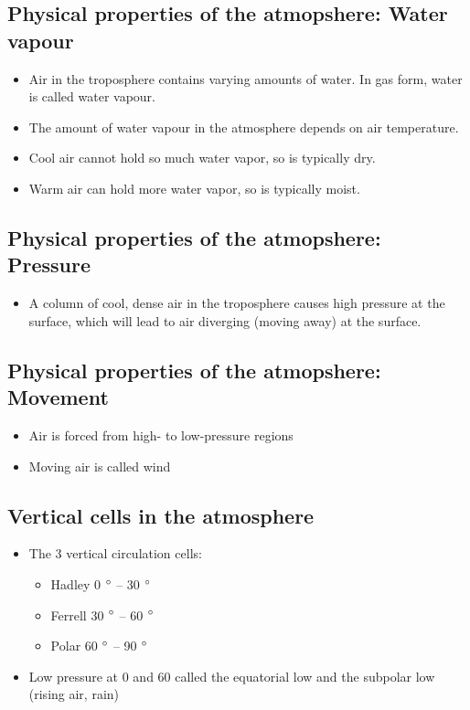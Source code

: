 \subsection{Physical properties of the atmopshere: Water vapour}

\begin{itemize}
    \item Air in the troposphere contains varying amounts of water. In gas
        form, water is called water vapour.
    \item The amount of water vapour in the atmosphere depends on air
        temperature.
    \item Cool air cannot hold so much water vapor, so is typically dry.
    \item Warm air can hold more water vapor, so is typically moist.
\end{itemize}

\subsection{Physical properties of the atmopshere: Pressure}

\begin{itemize}
    \item A column of cool, dense air in the troposphere causes high pressure
        at the surface, which will lead to air diverging (moving away) at the
        surface.
\end{itemize}

\subsection{Physical properties of the atmopshere: Movement}

\begin{itemize}
    \item Air is forced from high- to low-pressure regions
    \item Moving air is called wind
\end{itemize}

\subsection{Vertical cells in the atmosphere}

\begin{itemize}
    \item The 3 vertical circulation cells:
    \begin{itemize}
        \item Hadley 0 $\degree$ -- 30 $\degree$
        \item Ferrell 30 $\degree$ -- 60 $\degree$
        \item Polar 60 $\degree$ -- 90 $\degree$
    \end{itemize}
    \item Low pressure at 0 and 60 called the equatorial low and the subpolar
        low (rising air, rain)
\end{itemize}

